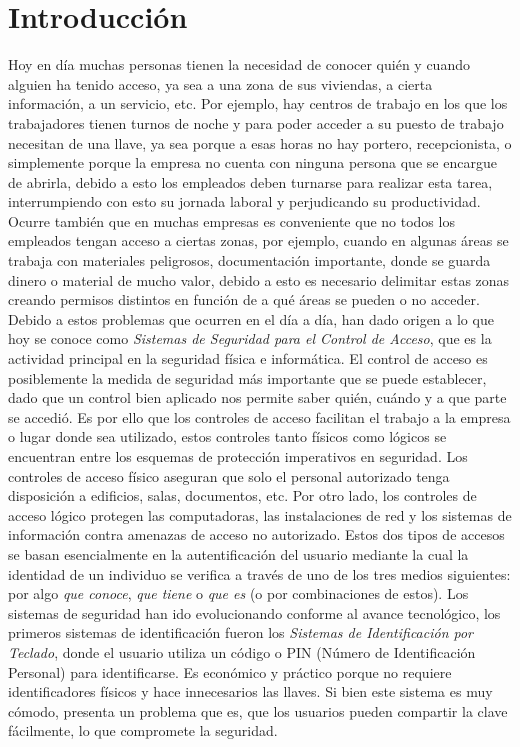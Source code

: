 \chapter{Introducción}
\setcounter{page}{1}
Hoy en día muchas personas tienen la necesidad de conocer quién y cuando alguien ha tenido acceso, ya sea a una zona de sus viviendas, a cierta información, a un servicio, etc. Por ejemplo, hay centros de trabajo en los que los trabajadores tienen turnos de noche y para poder acceder a su puesto de trabajo necesitan de una llave, ya sea porque a esas horas no hay portero, recepcionista, o simplemente porque la empresa no cuenta con ninguna persona que se encargue de abrirla, debido a esto los empleados deben turnarse para realizar esta tarea, interrumpiendo con esto su jornada laboral y perjudicando su productividad. 
\vskip 0.5cm
Ocurre también que en muchas empresas es conveniente que no todos los empleados tengan acceso a ciertas zonas, por ejemplo, cuando en algunas áreas se trabaja con materiales peligrosos, documentación importante, donde se guarda dinero o material de mucho valor, debido a esto es necesario delimitar estas zonas creando permisos distintos en función de a qué áreas se pueden o no acceder.
\vskip 0.5cm
Debido a estos problemas que ocurren en el día a día, han dado origen a lo que hoy se conoce como \textit{Sistemas de Seguridad para el Control de Acceso}, que es la actividad principal en la seguridad física e informática. El control de acceso es posiblemente la medida de seguridad más importante que se puede establecer, dado que un control bien aplicado nos permite saber quién, cuándo y a que parte se accedió.
\vskip 0.5cm
Es por ello que los controles de acceso facilitan el trabajo a la empresa o lugar donde sea utilizado, estos controles tanto físicos como lógicos se encuentran entre los esquemas de protección imperativos en seguridad. Los controles de acceso físico aseguran que solo el personal autorizado tenga disposición a edificios, salas, documentos, etc. Por otro lado, los controles de acceso lógico protegen las computadoras, las instalaciones de red y los sistemas de información contra amenazas de acceso no autorizado. Estos dos tipos de accesos se basan esencialmente en la autentificación del usuario mediante la cual la identidad de un individuo se verifica a través de uno de los tres medios siguientes: por algo \textit{que conoce}, \textit{que tiene} o \textit{que es} (o por combinaciones de estos).
\vskip 0.5cm
Los sistemas de seguridad han ido evolucionando conforme al avance tecnológico, los primeros sistemas de identificación fueron los \textit{Sistemas de Identificación por Teclado}, donde el usuario utiliza un código o PIN (Número de Identificación Personal) para identificarse. Es económico y práctico porque no requiere identificadores físicos y hace innecesarios las llaves. Si bien este sistema es muy cómodo, presenta un problema que es, que los usuarios pueden compartir la clave fácilmente, lo que compromete la seguridad.

